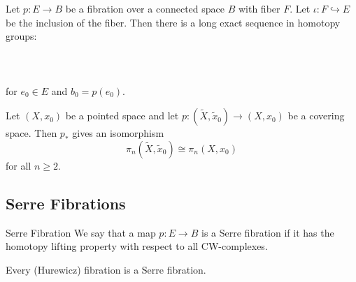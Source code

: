 \documentclass[a4paper]{article}
\begin{document}
\begin{thm}{}{} Let $p:E\to B$ be a fibration over a connected space $B$ with fiber $F$. Let $\iota:F\hookrightarrow E$ be the inclusion of the fiber. Then there is a long exact sequence in homotopy groups: \\~\\
\\~\\
for $e_0\in E$ and $b_0=p(e_0)$. 
\end{thm}

\begin{crl}{}{} Let $(X,x_0)$ be a pointed space and let $p:(\tilde{X},\tilde{x}_0)\to(X,x_0)$ be a covering space. Then $p_\ast$ gives an isomorphism $$\pi_n(\tilde{X},\tilde{x}_0)\cong\pi_n(X,x_0)$$ for all $n\geq 2$. 
\end{crl}

\subsection{Serre Fibrations}
\begin{defn}{Serre Fibration}{} We say that a map $p:E\to B$ is a Serre fibration if it has the homotopy lifting property with respect to all CW-complexes. 
\end{defn}

\begin{prp}{}{} Every (Hurewicz) fibration is a Serre fibration. 
\end{prp}
\end{document}
